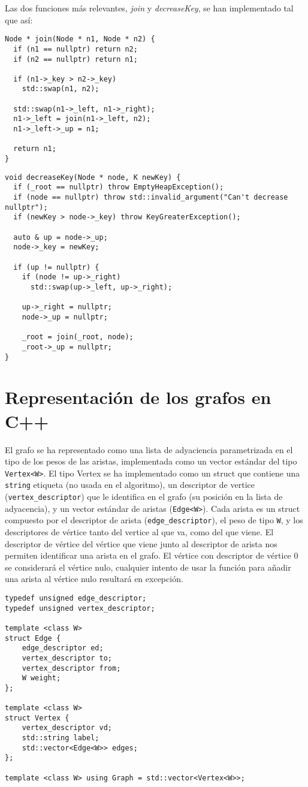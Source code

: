 \documentclass{article}
\begin{document}
Las dos funciones más relevantes, \textit{join} y \textit{decreaseKey}, se han implementado tal que así:

\begin{verbatim}
Node * join(Node * n1, Node * n2) {
  if (n1 == nullptr) return n2;
  if (n2 == nullptr) return n1;

  if (n1->_key > n2->_key)
	std::swap(n1, n2);

  std::swap(n1->_left, n1->_right);
  n1->_left = join(n1->_left, n2);
  n1->_left->_up = n1;

  return n1;
}
\end{verbatim}
\begin{verbatim}
void decreaseKey(Node * node, K newKey) {
  if (_root == nullptr) throw EmptyHeapException();
  if (node == nullptr) throw std::invalid_argument("Can't decrease nullptr");
  if (newKey > node->_key) throw KeyGreaterException();

  auto & up = node->_up;
  node->_key = newKey;

  if (up != nullptr) {
	if (node != up->_right)
	  std::swap(up->_left, up->_right);

	up->_right = nullptr;
	node->_up = nullptr;

	_root = join(_root, node);
	_root->_up = nullptr;
}
\end{verbatim}

\section{Representación de los grafos en C++}
El grafo se ha representado como una lista de adyaciencia parametrizada
en el tipo de los pesos de las aristas, implementada como un vector estándar del 
tipo \texttt{Vertex<W>}. El tipo Vertex se ha implementado como un struct que
contiene una \texttt{string} etiqueta (no usada en el algoritmo), un descriptor de
vertice (\texttt{vertex\_descriptor}) que le identifica en el grafo (su posición en
la lista de adyacencia), y un vector estándar de aristas (\texttt{Edge<W>}). Cada arista es un struct compuesto por el descriptor de arista (\texttt{edge\_descriptor}), el peso de tipo \texttt{W}, y los descriptores de vértice tanto del vertice al que va, como del que viene. El descriptor de vértice del vértice que viene junto al descriptor de arista nos permiten identificar una arista en el grafo. El vértice con descriptor de vértice 0 se considerará el vértice nulo, cualquier intento de usar la función para añadir una arista al vértice nulo resultará en excepción.
\begin{verbatim}
typedef unsigned edge_descriptor;
typedef unsigned vertex_descriptor;

template <class W> 
struct Edge {
    edge_descriptor ed;
    vertex_descriptor to;
    vertex_descriptor from;
    W weight;
};

template <class W>
struct Vertex {
    vertex_descriptor vd;
    std::string label;
    std::vector<Edge<W>> edges;
};

template <class W> using Graph = std::vector<Vertex<W>>;
\end{verbatim}
\end{document}
